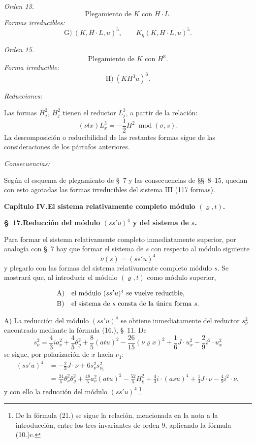 \documentclass[11pt]{article}
\newcommand{\modu}[1]{\;\operatorname{mod} #1}
\begin{document}
\noindent\emph{Orden 13.}
\[
\text{Plegamiento de }K\text{ con }H\cdot L.
\]
\noindent\emph{Formas irreducibles:}
\[
\text{G)}\ (K,H\cdot L,u)^5,
\qquad K_\eta(K,H\cdot L,u)^5.
\]

\noindent\emph{Orden 15.}
\[
\text{Plegamiento de }K\text{ con }H^3.
\]
\noindent\emph{Forma irreducible:}
\[
\text{H)}\ (KH^3u)^6.
\]

\noindent\emph{Reducciones:}

Las formas $H_j^2$, $H_j^2$ tienen el reductor $L_j^3$, a partir de la relación:
\[
(\nu lx)L_x^3=-\frac12H^2\modu{(\sigma,s)}.
\]
La descomposición o reducibilidad de las restantes formas sigue de las consideraciones de los párrafos anteriores.

\noindent\emph{Consecuencias:}

Según el esquema de plegamiento de \S\ 7 y las consecuencias de \S\S\ 8--15, quedan con esto agotadas las formas irreducibles del sistema III (117 formas).

\clearpage

\begin{center}
{\Large\bfseries Capítulo IV.\quad El sistema relativamente completo módulo $(\varrho,t)$.}
\end{center}

\begin{center}
\textbf{\S\ 17.\quad Reducción del módulo $(ss'u)^4$ y del sistema de $s$.}
\end{center}

Para formar el sistema relativamente completo inmediatamente superior, por analogía con \S\ 7 hay que formar el sistema de $s$ con respecto al módulo siguiente
\[
\nu(s)=(ss'u)^4
\]
y plegarlo con las formas del sistema relativamente completo módulo $s$. Se mostrará que, al introducir el módulo $(\varrho,t)$ como módulo superior,
\[
\begin{array}{ll}
\text{A)}&\text{el módulo }(ss'u)^4\text{ se vuelve reducible,}\vphantom{\dfrac11}\\
\text{B)}&\text{el sistema de }s\text{ consta de la única forma }s.
\end{array}
\]

A) La reducción del módulo $(ss'u)^4$ se obtiene inmediatamente del reductor $s_\nu^2$ encontrado mediante la fórmula (16.), \S\ 11. De
\[
 s_\nu^2=\frac43 i a_\nu^2+\frac45\theta_\varrho^2+\frac85(atu)^2-
 \frac{26}{15}(\nu\varrho x)^2+\frac16J\cdot u_x^2-
 \frac29i^2\cdot u_x^2
\]
se sigue, por polarización de $x$ hacia $\nu_1$:
\[
\tag{21}
\begin{aligned}
(ss'u)^4&=-\frac23J\cdot\nu+6s_\nu^2s_{\nu_1}^2\\
&=\frac{24}{5}\theta_\nu^2\theta_\varrho^2+
\frac{48}{5}a_\nu^2(atu)^2-
\frac{52}{5}H_\varrho^2+
\frac43i\cdot(asu)^4+\frac13J\cdot\nu-
\frac49i^2\cdot\nu,
\end{aligned}
\]
y con ello la reducción del módulo $(ss'u)^4$.\footnote{De la fórmula (21.) se sigue la relación, mencionada en la nota a la introducción, entre los tres invariantes de orden 9, aplicando la fórmula (10.)c.}
\end{document}
